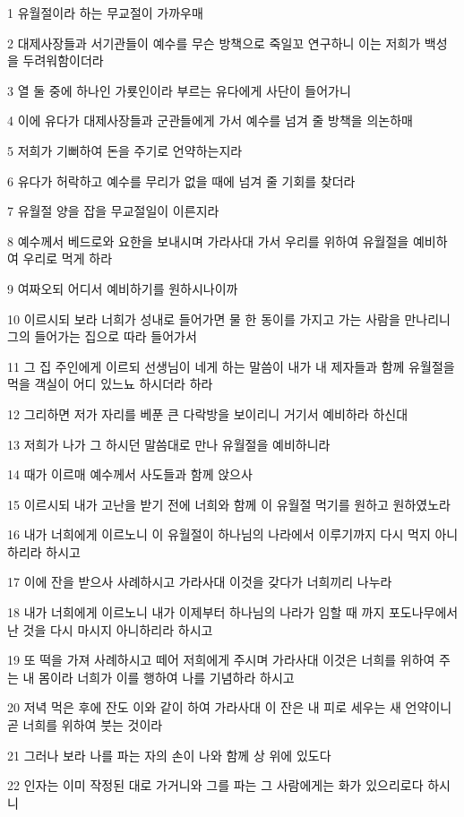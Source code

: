 \par 1 유월절이라 하는 무교절이 가까우매
\par 2 대제사장들과 서기관들이 예수를 무슨 방책으로 죽일꼬 연구하니 이는 저희가 백성을 두려워함이더라
\par 3 열 둘 중에 하나인 가룟인이라 부르는 유다에게 사단이 들어가니
\par 4 이에 유다가 대제사장들과 군관들에게 가서 예수를 넘겨 줄 방책을 의논하매
\par 5 저희가 기뻐하여 돈을 주기로 언약하는지라
\par 6 유다가 허락하고 예수를 무리가 없을 때에 넘겨 줄 기회를 찾더라
\par 7 유월절 양을 잡을 무교절일이 이른지라
\par 8 예수께서 베드로와 요한을 보내시며 가라사대 가서 우리를 위하여 유월절을 예비하여 우리로 먹게 하라
\par 9 여짜오되 어디서 예비하기를 원하시나이까
\par 10 이르시되 보라 너희가 성내로 들어가면 물 한 동이를 가지고 가는 사람을 만나리니 그의 들어가는 집으로 따라 들어가서
\par 11 그 집 주인에게 이르되 선생님이 네게 하는 말씀이 내가 내 제자들과 함께 유월절을 먹을 객실이 어디 있느뇨 하시더라 하라
\par 12 그리하면 저가 자리를 베푼 큰 다락방을 보이리니 거기서 예비하라 하신대
\par 13 저희가 나가 그 하시던 말씀대로 만나 유월절을 예비하니라
\par 14 때가 이르매 예수께서 사도들과 함께 앉으사
\par 15 이르시되 내가 고난을 받기 전에 너희와 함께 이 유월절 먹기를 원하고 원하였노라
\par 16 내가 너희에게 이르노니 이 유월절이 하나님의 나라에서 이루기까지 다시 먹지 아니하리라 하시고
\par 17 이에 잔을 받으사 사례하시고 가라사대 이것을 갖다가 너희끼리 나누라
\par 18 내가 너희에게 이르노니 내가 이제부터 하나님의 나라가 임할 때 까지 포도나무에서 난 것을 다시 마시지 아니하리라 하시고
\par 19 또 떡을 가져 사례하시고 떼어 저희에게 주시며 가라사대 이것은 너희를 위하여 주는 내 몸이라 너희가 이를 행하여 나를 기념하라 하시고
\par 20 저녁 먹은 후에 잔도 이와 같이 하여 가라사대 이 잔은 내 피로 세우는 새 언약이니 곧 너희를 위하여 붓는 것이라
\par 21 그러나 보라 나를 파는 자의 손이 나와 함께 상 위에 있도다
\par 22 인자는 이미 작정된 대로 가거니와 그를 파는 그 사람에게는 화가 있으리로다 하시니
